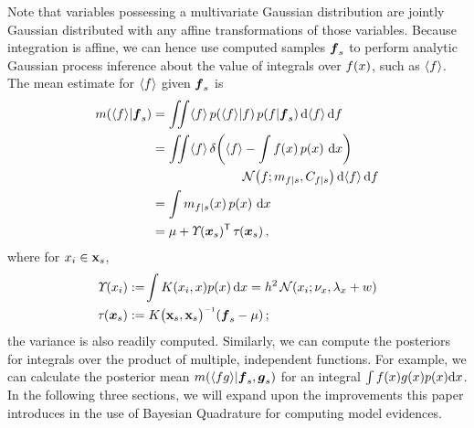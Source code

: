 \documentclass{article}
\begin{document}
Note that variables possessing a multivariate Gaussian distribution are jointly Gaussian distributed with any affine transformations of those variables. Because integration is affine, we can hence use computed samples $\vf_s$ to perform analytic Gaussian process inference about the value of integrals over $f(\lfv)$, such as $\inty{f}$. The mean estimate for $\inty{f}$ given $\vf_s$ is
%
\begin{align} \label{eq:mean_inty_f}
\mean{\inty{f}}{\vf_s}
& 
=\iint \inty{f}\,\p{\inty{f}}{f}\p{f}{\vf_s} \ud \inty{f} \,\ud f                                                                                                                                                               \nonumber\\
&
 =\iint \inty{f}\,\dd{\inty{f}}{\int f(\lfv)\,\po{\lfv}\,\ud\lfv}
\nonumber\\
&\hspace{2.5cm}
\N{f}{\meancondfn{f}{s}}{C_{f|s}} \ud \inty{f} \,\ud f \nonumber\\
&
 = \int \meancondfn{f}{s}(\lfv)\,\po{\lfv}\,\ud\lfv\nonumber\\
&
 = 
\mu + \ntT{s}{}\, \dtt{s}{}
\,,
\end{align}
where \citep{BZMonteCarlo} for $\lfv_i \in \vlfv_s$,
\begin{align}
\fnt{\lfv_i}{} & \deq \!\int K(\lfv_i,\lfv)\po{\lfv}\ud\lfv
 = h^2\,\N{\lfv_i}{\nu_{\lfv}}{\lambda_{\lfv}+w}\nonumber\\
\dtt{s}{} & \deq K\bigl(\vlfv_s,\vlfv_s\bigr)\inv (\vf_s-{\mu})\,;
\end{align}
%
%
the variance is also readily computed. Similarly, we can compute the posteriors for integrals over the product of multiple, independent functions. For example, we can calculate the posterior mean 
$\mean{\inty{f g}}{\vf_s, \vect{g}_s}$ for an integral $\int f(x) g(x) p(x) \ud x$. 
 In the following three sections, we will expand upon the improvements this paper introduces in the use of Bayesian Quadrature for computing model evidences.
\end{document}
